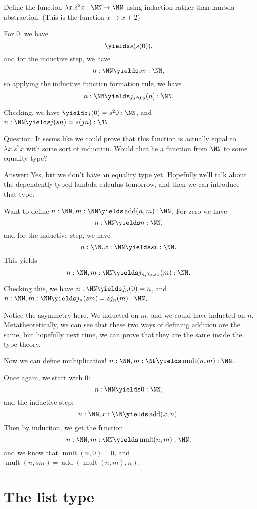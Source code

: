 \documentclass{article}
\newcommand\add{\operatorname{add}}
\newcommand\mult{\operatorname{mult}}
\begin{document}
\begin{example}
    Define the function $\lambda x.s^2 x : \NN\to \NN$
    using induction rather than lambda abstraction.
    (This is the function $x\mapsto x+2$)

    For $0$, we have
    \[\yields s(s(0)), \]
    and for the inductive step, we have
    \[ n:\NN \yields sn :\NN, \]
    so applying the inductive function formation rule, we have 
    \[n:\NN \yields j_{s^20,s}(n) : \NN.\]

    Checking, we have $\yields j(0) = s^20:\NN$,
    and $n:\NN \yields j(sn) = s(jn) : \NN$.

    Question: It seems like we could prove that this function
    is actually equal to $\lambda x.s^2x$ with some sort of 
    induction. Would that be a function from $\NN$ to some 
    equality type?

    Answer: Yes, but we don't have an equality type yet.
    Hopefully we'll talk about the dependently typed lambda 
    calculus tomorrow, and then we can introduce that type.
\end{example}

\begin{example}
Want to define $n:\NN, m: \NN\yields \add(n,m):\NN$.
For zero we have 
\[n:\NN\yields n:\NN, \]
and for the inductive step, we have
\[n:\NN,x:\NN \yields sx : \NN. \]
This yields 
\[n:\NN,m:\NN \yields j_{n,\lambda x.sx}(m) : \NN. \]

Checking this, we have $n:\NN \yields j_n(0) = n$,
and $n:\NN,m:\NN \yields j_n(sm) = sj_n(m) : \NN$.

Notice the asymmetry here. We inducted on $m$, and we could have
inducted on $n$. Metatheoretically, we can see that these two 
ways of defining addition are the same, but hopefully 
next time, we can prove that they are the same inside the 
type theory.
\end{example}

\begin{example}
    Now we can define multiplication!
    $n:\NN, m:\NN \yields\mult(n,m):\NN$.

    Once again, we start with $0$:
    \[ n:\NN \yields 0:\NN, \]
    and the inductive step:
    \[ n:\NN,x:\NN \yields \add(x,n).\]
    Then by induction, we get the function
    \[ n:\NN, m:\NN \yields \mult(n,m):\NN, \]
    and we know that 
    $\mult(n,0)=0$, and $\mult(n,sm) = \add(\mult(n,m),n)$.
\end{example}

\section{The list type}
\end{document}
